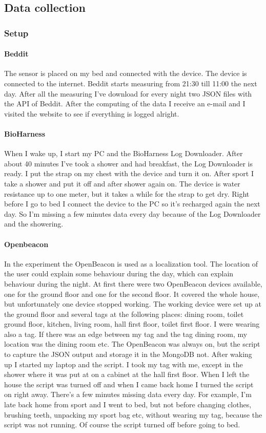 	\subsection{Data collection}
		\subsubsection{Setup}
			\paragraph{Beddit}
				The sensor is placed on my bed and connected with the device. The device is connected to the internet. Beddit starts measuring from 21:30 till 11:00 the next day. After all the measuring I've download for every night two JSON files with the API of Beddit\cite{bedditapi}. After the computing of the data I receive an e-mail and I visited the website to see if everything is logged alright.
			\paragraph{BioHarness}
				When I wake up, I start my PC and the BioHarness Log Downloader. After about 40 minutes I've took a shower and had breakfast, the Log Downloader is ready. I put the strap on my chest with the device and turn it on. After sport I take a shower and put it off and after shower again on. The device is water resistance up to one meter, but it takes a while for the strap to get dry. Right before I go to bed I connect the device to the PC so it's recharged again the next day. So I'm missing a few minutes data every day because of the Log Downloader and the showering. 
			\paragraph{Openbeacon}
		 		In the experiment the OpenBeacon is used as a localization tool. The location of the user could explain some behaviour during the day, which can explain behaviour during the night. At first there were two OpenBeacon devices available, one for the ground floor and one for the second floor. It covered the whole house, but unfortunately one device stopped working. The working device were set up at the ground floor and several tags at the following places: dining room, toilet ground floor, kitchen, living room, hall first floor, toilet first floor. I were wearing also a tag. If there was an edge between my tag and the tag dining room, my location was the dining room etc. The OpenBeacon was always on, but the script to capture the JSON output and storage it in the MongoDB not. After waking up I started my laptop and the script. I took my tag with me, except in the shower where it was put at on a cabinet at the hall first floor. When I left the house the script was turned off and when I came back home I turned the script on right away. There's a few minutes missing data every day. For example, I'm late back home from sport and I went to bed, but not before changing clothes, brushing teeth, unpacking my sport bag etc, without wearing my tag, because the script was not running. Of course the script turned off before going to bed.

